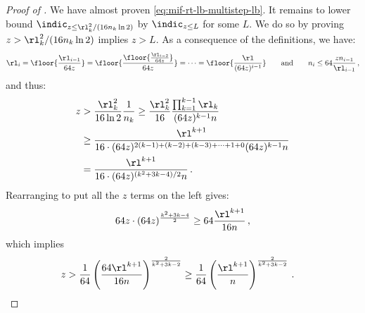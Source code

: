 \begin{itemize}
\begin{itemize}
\begin{proof}[Proof of ]
  We have almost proven \cref{eq:mif-rt-lb-multistep-lb}. It remains to lower bound
  $\indic_{z \le \rl_k^2 / (16 n_k \ln 2)}$ by $\indic_{z \le L}$ for some $L$. We do so by proving $z > \rl_k^2 / (16 n_k \ln 2)$ implies $z > L$. As a consequence of the definitions, we have:
  \begin{align*}
    \rl_i 
    =  \floor{\frac{\rl_{i-1}}{64 z} } 
    = \floor{\frac{\floor{\frac{\rl_{i-2}}{64 z}}}{64 z} } 
    = \cdots 
    =\floor{\frac{\rl}{(64 z)^{i-1}} } 
    \qquad \text{and} \qquad 
    n_i \le 64 \frac{z n_{i-1}}{\rl_{i-1}} \,,
  \end{align*}
  and thus:
  \begin{align*}
     z &> \frac{\rl_{k}^2}{16 \ln 2} \frac{1}{n_{k}} \ge \frac{\rl_{k}^2}{16} \frac{\prod_{k=1}^{k - 1} \rl_{k} }{(64 z)^{k - 1} n} \\
      & \ge \frac{\rl^{k + 1} }{16 \cdot (64 z)^{2 (k -1) + (k - 2) + (k - 3) + \cdots + 1 + 0}  (64 z)^{k - 1} n} \\
      & = \frac{\rl^{k + 1} }{16 \cdot (64 z)^{(k^2 + 3 k - 4) / 2} n} \,.
  \end{align*}
  Rearranging to put all the $z$ terms on the left gives:
  \begin{align*}
    64 z \cdot (64 z)^{\frac{k^2 + 3k - 4}{2}} \ge 64 \frac{\rl^{k+1}}{16 n} \,,
  \end{align*}
  which implies
  \begin{align*}
    z &> \frac{1}{64} \left(\frac{64 \rl^{k + 1}}{16 n}\right)^{\frac{2}{k^2 + 3 k - 2}} \ge \frac{1}{64} \left(\frac{\rl^{k + 1}}{n}\right)^{\frac{2}{k^2 + 3 k - 2}} \,. \qedhere
  \end{align*}
\end{proof}


\end{itemize}
\end{itemize}
